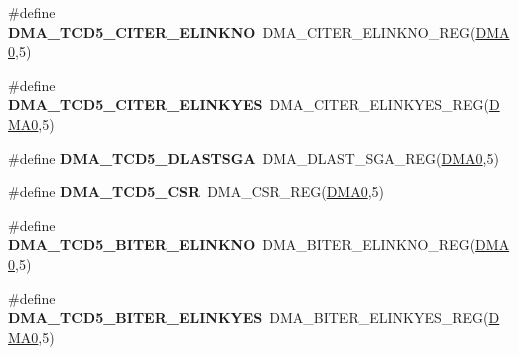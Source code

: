 \begin{DoxyCompactItemize}
\item 
\#define {\bfseries D\+M\+A\+\_\+\+T\+C\+D5\+\_\+\+C\+I\+T\+E\+R\+\_\+\+E\+L\+I\+N\+K\+NO}~D\+M\+A\+\_\+\+C\+I\+T\+E\+R\+\_\+\+E\+L\+I\+N\+K\+N\+O\+\_\+\+R\+EG(\hyperlink{group__DMA__Peripheral__Access__Layer_ga4103044f9ca209772f513dc694513ffb}{D\+M\+A0},5)\hypertarget{group__DMA__Register__Accessor__Macros_ga5ba7709b2c12b5d611c4bd4fe9b6a7f9}{}\label{group__DMA__Register__Accessor__Macros_ga5ba7709b2c12b5d611c4bd4fe9b6a7f9}

\item 
\#define {\bfseries D\+M\+A\+\_\+\+T\+C\+D5\+\_\+\+C\+I\+T\+E\+R\+\_\+\+E\+L\+I\+N\+K\+Y\+ES}~D\+M\+A\+\_\+\+C\+I\+T\+E\+R\+\_\+\+E\+L\+I\+N\+K\+Y\+E\+S\+\_\+\+R\+EG(\hyperlink{group__DMA__Peripheral__Access__Layer_ga4103044f9ca209772f513dc694513ffb}{D\+M\+A0},5)\hypertarget{group__DMA__Register__Accessor__Macros_ga893ee9571766a4deef0040cc52f0f353}{}\label{group__DMA__Register__Accessor__Macros_ga893ee9571766a4deef0040cc52f0f353}

\item 
\#define {\bfseries D\+M\+A\+\_\+\+T\+C\+D5\+\_\+\+D\+L\+A\+S\+T\+S\+GA}~D\+M\+A\+\_\+\+D\+L\+A\+S\+T\+\_\+\+S\+G\+A\+\_\+\+R\+EG(\hyperlink{group__DMA__Peripheral__Access__Layer_ga4103044f9ca209772f513dc694513ffb}{D\+M\+A0},5)\hypertarget{group__DMA__Register__Accessor__Macros_ga48b181f26b13735d9b3d366f746b0995}{}\label{group__DMA__Register__Accessor__Macros_ga48b181f26b13735d9b3d366f746b0995}

\item 
\#define {\bfseries D\+M\+A\+\_\+\+T\+C\+D5\+\_\+\+C\+SR}~D\+M\+A\+\_\+\+C\+S\+R\+\_\+\+R\+EG(\hyperlink{group__DMA__Peripheral__Access__Layer_ga4103044f9ca209772f513dc694513ffb}{D\+M\+A0},5)\hypertarget{group__DMA__Register__Accessor__Macros_ga21f0f7acf8241ec5707391950832b8bf}{}\label{group__DMA__Register__Accessor__Macros_ga21f0f7acf8241ec5707391950832b8bf}

\item 
\#define {\bfseries D\+M\+A\+\_\+\+T\+C\+D5\+\_\+\+B\+I\+T\+E\+R\+\_\+\+E\+L\+I\+N\+K\+NO}~D\+M\+A\+\_\+\+B\+I\+T\+E\+R\+\_\+\+E\+L\+I\+N\+K\+N\+O\+\_\+\+R\+EG(\hyperlink{group__DMA__Peripheral__Access__Layer_ga4103044f9ca209772f513dc694513ffb}{D\+M\+A0},5)\hypertarget{group__DMA__Register__Accessor__Macros_ga16a45975974259d9c0822a80fc4235b5}{}\label{group__DMA__Register__Accessor__Macros_ga16a45975974259d9c0822a80fc4235b5}

\item 
\#define {\bfseries D\+M\+A\+\_\+\+T\+C\+D5\+\_\+\+B\+I\+T\+E\+R\+\_\+\+E\+L\+I\+N\+K\+Y\+ES}~D\+M\+A\+\_\+\+B\+I\+T\+E\+R\+\_\+\+E\+L\+I\+N\+K\+Y\+E\+S\+\_\+\+R\+EG(\hyperlink{group__DMA__Peripheral__Access__Layer_ga4103044f9ca209772f513dc694513ffb}{D\+M\+A0},5)\hypertarget{group__DMA__Register__Accessor__Macros_ga07c9d47975d63acab5c79b21b8fa0631}{}\label{group__DMA__Register__Accessor__Macros_ga07c9d47975d63acab5c79b21b8fa0631}


\end{DoxyCompactItemize}
